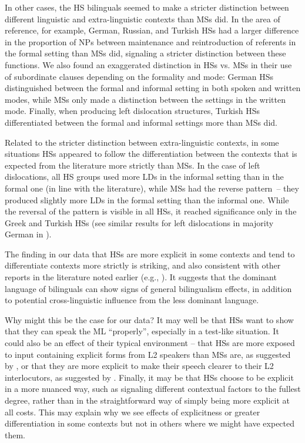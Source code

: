 \documentclass[output=paper,colorlinks,citecolor=brown]{langscibook}
\begin{document}
In other cases, the HS bilinguals seemed to make a stricter distinction between different linguistic and extra-linguistic contexts than MSs did. In the area of reference, for example, German, Russian, and Turkish HSs had a larger difference in the proportion of NPs between maintenance and reintroduction of referents in the formal setting than MSs did, signaling a stricter distinction between these functions. We also found an exaggerated distinction in HSs vs. MSs in their use of subordinate clauses depending on the formality and mode: German HSs distinguished between the formal and informal setting in both spoken and written modes, while MSs only made a distinction between the settings in the written mode. Finally, when producing left dislocation structures, Turkish HSs differentiated between the formal and informal settings more than MSs did.

Related to the stricter distinction between extra-linguistic contexts, in some situations HSs appeared to follow the differentiation between the contexts that is expected from the literature more strictly than MSs. In the case of left dislocations, all HS groups used more LDs in the informal setting than in the formal one (in line with the literature), while MSs had the reverse pattern~-- they produced slightly more LDs in the formal setting than the informal one. While the reversal of the pattern is visible in all HSs, it reached significance only in the Greek and Turkish HSs (see similar results for left dislocations in majority German in ).

The finding in our data that HSs are more explicit in some contexts and tend to differentiate contexts more strictly is striking, and also consistent with other reports in the literature noted earlier (e.g., \cite{Serratrice2004, Barbosa2017, Polinsky2018book, azar2020reference}). It suggests that the dominant language of bilinguals can show signs of general bilingualism effects, in addition to potential cross-linguistic influence from the less dominant language.

Why might this be the case for our data? It may well be that HSs want to show that they can speak the ML “properly”, especially in a test-like situation. It could also be an effect of their typical environment -- that HSs are more exposed to input containing explicit forms from L2 speakers than MSs are, as suggested by \citet{azar2020reference}, or that they are more explicit to make their speech clearer to their L2 interlocutors, as suggested by \citet{Polinsky2018book}. Finally, it may be that HSs choose to be explicit in a more nuanced way, such as signaling different contextual factors to the fullest degree, rather than in the straightforward way of simply being more explicit at all costs. This may explain why we see effects of explicitness or greater differentiation in some contexts but not in others where we might have expected them.
\end{document}
